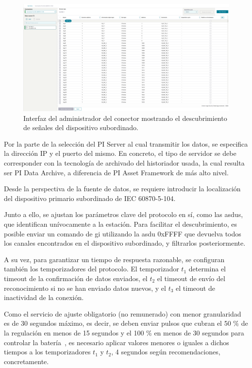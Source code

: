 \begin{figure}
  \centering
  \includegraphics[width=0.75\linewidth]{figures/administador-del-conector.png}
  \caption[Interfaz del administrador del conector.]{Interfaz del administrador del conector mostrando el descubrimiento de señales del dispositivo subordinado.}%
  \label{fig:administador-del-conector}
\end{figure}

Por la parte de la selección del PI Server al cual transmitir los datos, se especifica la dirección IP y el puerto del mismo. En concreto, el tipo de servidor se debe corresponder con la tecnología de archivado del historiador usada, la cual resulta ser PI Data Archive, a diferencia de PI Asset Framework de más alto nivel.

Desde la perspectiva de la fuente de datos, se requiere introducir la localización del dispositivo primario subordinado de IEC 60870{-}5{-}104.

Junto a ello, se ajustan los parámetros clave del protocolo en sí, como las \glspl{asdu}, que identifican unívocamente a la estación. Para facilitar el descubrimiento, es posible enviar un comando de \gls{gi} utilizando la \gls{asdu} 0xFFFF que devuelva todos los canales encontrados en el dispositivo subordinado, y filtrarlos posteriormente.

A su vez, para garantizar un tiempo de respuesta razonable, se configuran también los temporizadores del protocolo. El temporizador \( t_1 \) determina el timeout de la confirmación de datos enviados, el \( t_2 \) el timeout de envío del reconocimiento si no se han enviado datos nuevos, y el \( t_3 \) el timeout de inactividad de la conexión.

Como el servicio de ajuste obligatorio (no remunerado) con menor granularidad es de 30 segundos máximo, es decir, se deben enviar pulsos que cubran el 50 \% de la regulación en menos de 15 segundos y el 100 \% en menos de 30 segundos para controlar la batería~\cite{cnmc2024balance}, es necesario aplicar valores menores o iguales a dichos tiempos a los temporizadores \( t_1 \) y \( t_2 \), 4 segundos según recomendaciones, concretamente.

